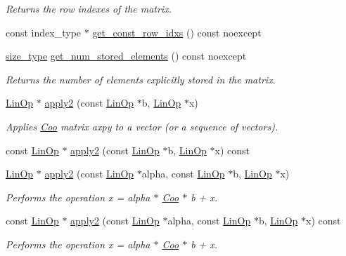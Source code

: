 \begin{DoxyCompactItemize}
\begin{DoxyCompactList}\small\item\em Returns the row indexes of the matrix. \end{DoxyCompactList}\item 
const index\+\_\+type $\ast$ \hyperlink{classgko_1_1matrix_1_1Coo_a0fe0f33bf492bf2f9134927c7ee90e81}{get\+\_\+const\+\_\+row\+\_\+idxs} () const noexcept
\item 
\hyperlink{namespacegko_a6e5c95df0ae4e47aab2f604a22d98ee7}{size\+\_\+type} \hyperlink{classgko_1_1matrix_1_1Coo_aece531e069f8490fd8d2b3ab58f72d09}{get\+\_\+num\+\_\+stored\+\_\+elements} () const noexcept
\begin{DoxyCompactList}\small\item\em Returns the number of elements explicitly stored in the matrix. \end{DoxyCompactList}\item 
\hyperlink{classgko_1_1LinOp}{Lin\+Op} $\ast$ \hyperlink{classgko_1_1matrix_1_1Coo_ad2e97eee0ad21f8896f4a82cc5ac8a50}{apply2} (const \hyperlink{classgko_1_1LinOp}{Lin\+Op} $\ast$b, \hyperlink{classgko_1_1LinOp}{Lin\+Op} $\ast$x)
\begin{DoxyCompactList}\small\item\em Applies \hyperlink{classgko_1_1matrix_1_1Coo}{Coo} matrix axpy to a vector (or a sequence of vectors). \end{DoxyCompactList}\item 
const \hyperlink{classgko_1_1LinOp}{Lin\+Op} $\ast$ \hyperlink{classgko_1_1matrix_1_1Coo_a48b3fd46edc8b1770f2800e94871eb41}{apply2} (const \hyperlink{classgko_1_1LinOp}{Lin\+Op} $\ast$b, \hyperlink{classgko_1_1LinOp}{Lin\+Op} $\ast$x) const
\item 
\hyperlink{classgko_1_1LinOp}{Lin\+Op} $\ast$ \hyperlink{classgko_1_1matrix_1_1Coo_a549dafbe9245e3fcef3b02c4d6914c84}{apply2} (const \hyperlink{classgko_1_1LinOp}{Lin\+Op} $\ast$alpha, const \hyperlink{classgko_1_1LinOp}{Lin\+Op} $\ast$b, \hyperlink{classgko_1_1LinOp}{Lin\+Op} $\ast$x)
\begin{DoxyCompactList}\small\item\em Performs the operation x = alpha $\ast$ \hyperlink{classgko_1_1matrix_1_1Coo}{Coo} $\ast$ b + x. \end{DoxyCompactList}\item 
const \hyperlink{classgko_1_1LinOp}{Lin\+Op} $\ast$ \hyperlink{classgko_1_1matrix_1_1Coo_a05062dbf88132edf3a13d23783a8b07d}{apply2} (const \hyperlink{classgko_1_1LinOp}{Lin\+Op} $\ast$alpha, const \hyperlink{classgko_1_1LinOp}{Lin\+Op} $\ast$b, \hyperlink{classgko_1_1LinOp}{Lin\+Op} $\ast$x) const
\begin{DoxyCompactList}\small\item\em Performs the operation x = alpha $\ast$ \hyperlink{classgko_1_1matrix_1_1Coo}{Coo} $\ast$ b + x. \end{DoxyCompactList}\end{DoxyCompactItemize}
